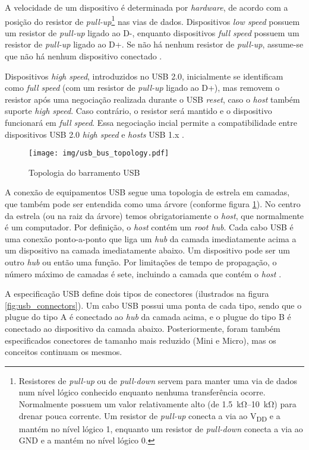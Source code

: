 \documentclass[brazil,pagestart=firstchapter]{abnt}
\newcommand*{\VDD}{V\textsubscript{DD}\xspace}
\newcommand*{\GND}{GND\xspace}
\begin{document}
A velocidade de um dispositivo é determinada por \textit{hardware}, de
acordo com a posição do resistor de \textit{pull-up}\footnote{
	Resistores de \textit{pull-up} ou de \textit{pull-down} servem para
	manter uma via de dados num nível lógico conhecido enquanto nenhuma
	transferência ocorre. Normalmente possuem um valor relativamente alto
	(de \SIrange{1.5}{10}{\kilo\ohm}) para drenar pouca corrente. Um
	resistor de \textit{pull-up} conecta a via ao \VDD e a mantém no nível
	lógico 1, enquanto um resistor de \textit{pull-down} conecta a via ao
	\GND e a mantém no nível lógico 0.}
nas vias de dados. Dispositivos
\textit{low speed} possuem um resistor de \textit{pull-up} ligado ao D-,
enquanto dispositivos \textit{full speed} possuem um resistor de
\textit{pull-up} ligado ao D+. Se não há nenhum resistor de
\textit{pull-up}, assume-se que não há nenhum dispositivo conectado
\cite{usb20} \cite{usbinanutshell}.

Dispositivos \textit{high speed}, introduzidos no \ac{USB} 2.0, inicialmente
se identificam como \textit{full speed} (com um resistor de \textit{pull-up}
ligado ao D+), mas removem o resistor após uma negociação realizada durante
o USB \textit{reset}, caso o \textit{host} também suporte \textit{high
speed}. Caso contrário, o resistor será mantido e o dispositivo funcionará
em \textit{full speed}. Essa negociação incial permite a compatibilidade
entre dispositivos USB 2.0 \textit{high speed} e \textit{hosts} USB 1.x
\cite{usb20} \cite{usbinanutshell}.

\begin{figure}[h]
\centering
\texttt{[image: img/usb\_bus\_topology.pdf]}
\caption{Topologia do barramento USB}
\label{fig:usb_topology}
\end{figure}

A conexão de equipamentos \ac{USB} segue uma topologia de estrela em
camadas, que também pode ser entendida como uma árvore (conforme figura
\ref{fig:usb_topology}). No centro da estrela (ou na raiz da árvore) temos
obrigatoriamente o \textit{host}, que normalmente é um computador. Por
definição, o \textit{host} contém um \textit{root hub}. Cada cabo \ac{USB} é
uma conexão ponto-a-ponto que liga um \textit{hub} da camada imediatamente
acima a um dispositivo na camada imediatamente abaixo. Um dispositivo pode
ser um outro \textit{hub} ou então uma função. Por limitações de tempo de
propagação, o número máximo de camadas é sete, incluindo a camada que contém
o \textit{host} \cite{usb20}.

A especificação \ac{USB} define dois tipos de conectores (ilustrados na
figura \ref{fig:usb_connectors}). Um cabo \ac{USB} possui uma ponta de cada
tipo, sendo que o plugue do tipo A é conectado ao \textit{hub} da camada
acima, e o plugue do tipo B é conectado ao dispositivo da camada abaixo.
Posteriormente, foram também especificados conectores de tamanho mais
reduzido (Mini e Micro), mas os conceitos continuam os mesmos.
\end{document}
